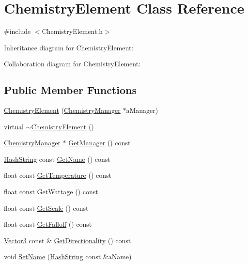 \hypertarget{classChemistryElement}{}\section{Chemistry\+Element Class Reference}
\label{classChemistryElement}


{\ttfamily \#include $<$Chemistry\+Element.\+h$>$}



Inheritance diagram for Chemistry\+Element\+:


Collaboration diagram for Chemistry\+Element\+:
\subsection*{Public Member Functions}
\begin{DoxyCompactItemize}
\item 
\hyperlink{classChemistryElement_acffde8c7c4a58291da337482ecaee9b2}{Chemistry\+Element} (\hyperlink{classChemistryManager}{Chemistry\+Manager} $\ast$a\+Manager)
\item 
virtual \hyperlink{classChemistryElement_a5ab42d67c3fa09fcc0afb38e0cfc3b09}{$\sim$\+Chemistry\+Element} ()
\item 
\hyperlink{classChemistryManager}{Chemistry\+Manager} $\ast$ \hyperlink{classChemistryElement_a9735b1678d85c2ef70ba2f37d4ba4372}{Get\+Manager} () const 
\item 
\hyperlink{classHashString}{Hash\+String} const \hyperlink{classChemistryElement_a9f37057282d657de961006e93a1c45b2}{Get\+Name} () const 
\item 
float const \hyperlink{classChemistryElement_ada597bb0ff0df1d9f8e32b0da58eb910}{Get\+Temperature} () const 
\item 
float const \hyperlink{classChemistryElement_a6f83315c7bb37feb9456fca43c5ef32d}{Get\+Wattage} () const 
\item 
float const \hyperlink{classChemistryElement_ad5e4ba4665172ad742d8fe33b24f7bf9}{Get\+Scale} () const 
\item 
float const \hyperlink{classChemistryElement_a671cd2e83d5c315efb52928c4ba0faf8}{Get\+Falloff} () const 
\item 
\hyperlink{structVector3}{Vector3} const \& \hyperlink{classChemistryElement_aadf0e4a8827c0e125a99690d002ff233}{Get\+Directionality} () const 
\item 
void \hyperlink{classChemistryElement_ac87f1ffccc3b68f3e61dace72cd4d839}{Set\+Name} (\hyperlink{classHashString}{Hash\+String} const \&a\+Name)

\end{DoxyCompactItemize}

